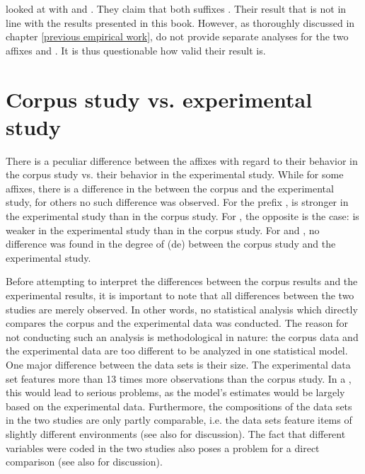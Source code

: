 \cite{Kotzor.2016} looked at  with  and . They claim that both suffixes . Their result that   is not in line with the results presented in this book. However, as thoroughly discussed in chapter \ref{previous empirical work}, \cite{Kotzor.2016} do not provide separate analyses for the two affixes  and . It is thus questionable how valid their result is. 


\section{Corpus study vs. experimental study}


There is a peculiar difference between the affixes with regard to their behavior in the corpus study vs. their behavior in the experimental study.
While for some affixes, there is a difference in the  between the corpus and the experimental study, for others no such difference was observed. For the prefix ,  is stronger in the experimental study than in the corpus study. For , the opposite is the case:  is weaker in the experimental study than in the corpus study. For  and , no difference was found in the degree of (de) between the corpus study and the experimental study.

Before attempting to interpret the differences between the corpus results and the experimental results, it is important to note that all differences between the two studies are merely observed. In other words, no statistical analysis which directly compares the corpus and the experimental data was conducted. The reason for not conducting such an analysis is methodological in nature: the corpus data and the experimental data are too different to be analyzed in one statistical model. 
One major difference between the data sets is their size. The experimental data set features more than 13 times more observations than the corpus study. In a , this would lead to serious problems, as the model's estimates would be largely based on the experimental data.
 Furthermore, the compositions of the data sets in the two studies are only partly comparable, i.e. the data sets feature items of slightly different environments (see also  for discussion). The fact that different variables were coded in the two studies also poses a problem for a direct comparison (see also  for discussion).

